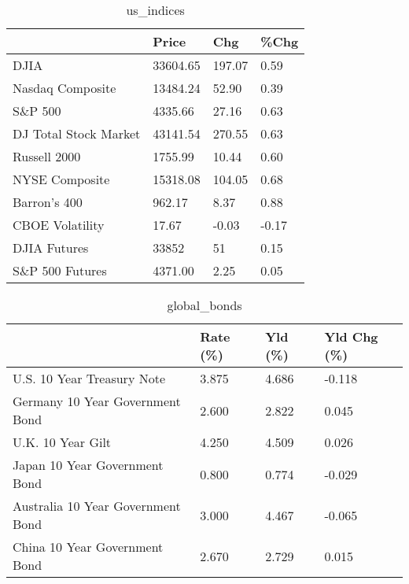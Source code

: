 \documentclass{article}%
\begin{document}
%


\begin{table}[htbp]%
\caption{us\_indices}%
\centering%
\begin{adjustbox}{width=1\textwidth}%
\begin{tabular}{llll}
\toprule
                      &    Price &    Chg &  \%Chg \\
\midrule
                 DJIA & 33604.65 & 197.07 &  0.59 \\
     Nasdaq Composite & 13484.24 &  52.90 &  0.39 \\
              S\&P 500 &  4335.66 &  27.16 &  0.63 \\
DJ Total Stock Market & 43141.54 & 270.55 &  0.63 \\
         Russell 2000 &  1755.99 &  10.44 &  0.60 \\
       NYSE Composite & 15318.08 & 104.05 &  0.68 \\
         Barron's 400 &   962.17 &   8.37 &  0.88 \\
      CBOE Volatility &    17.67 &  -0.03 & -0.17 \\
         DJIA Futures &    33852 &     51 &  0.15 \\
      S\&P 500 Futures &  4371.00 &   2.25 &  0.05 \\
\bottomrule
\end{tabular}
%
\end{adjustbox}%
\end{table}

%


\begin{table}[htbp]%
\caption{global\_bonds}%
\centering%
\begin{adjustbox}{width=1\textwidth}%
\begin{tabular}{llll}
\toprule
                                  & Rate (\%) & Yld (\%) & Yld Chg (\%) \\
\midrule
       U.S. 10 Year Treasury Note &    3.875 &   4.686 &      -0.118 \\
  Germany 10 Year Government Bond &    2.600 &   2.822 &       0.045 \\
                U.K. 10 Year Gilt &    4.250 &   4.509 &       0.026 \\
    Japan 10 Year Government Bond &    0.800 &   0.774 &      -0.029 \\
Australia 10 Year Government Bond &    3.000 &   4.467 &      -0.065 \\
    China 10 Year Government Bond &    2.670 &   2.729 &       0.015 \\
\bottomrule
\end{tabular}
%
\end{adjustbox}%
\end{table}
\end{document}
